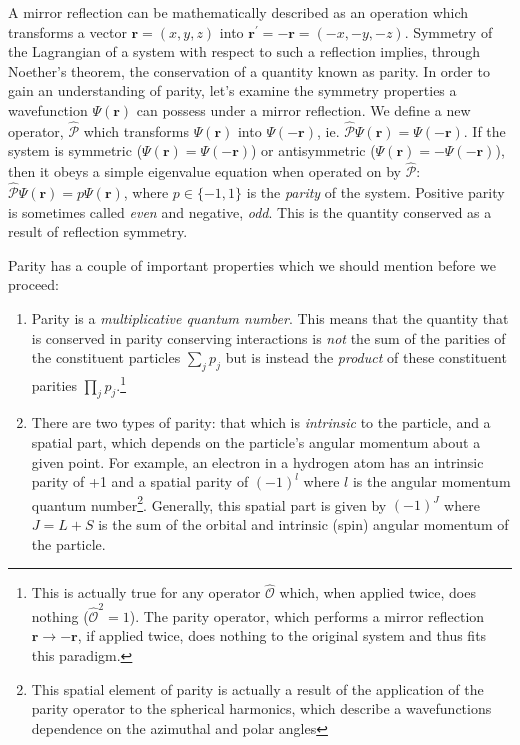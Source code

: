 \documentclass[12pt]{book}
\begin{document}
A mirror reflection can be mathematically described as an operation which transforms a vector $\mathbf{r}=(x,y,z)$ 
into 
$\mathbf{r^{'}}=-\mathbf{r}=(-x,-y,-z)$. 
Symmetry of the Lagrangian of a system with respect to such a reflection implies, through Noether's theorem, the conservation of a quantity known as parity. In order to gain an understanding of parity, let's examine the symmetry properties a wavefunction 
$\Psi(\mathbf{r})$ 
can possess under a mirror reflection. We define a new operator, 
$\hat{\mathcal{P}}$ 
which transforms 
$\Psi(\mathbf{r})$
into 
$\Psi(-\mathbf{r})$,
ie. $\hat{\mathcal{P}}\Psi(\mathbf{r})=\Psi(-\mathbf{r})$.
If the system is symmetric ($\Psi(\mathbf{r})=\Psi(-\mathbf{r})$) or antisymmetric ($\Psi(\mathbf{r})=-\Psi(-\mathbf{r})$), then it obeys a simple eigenvalue equation when operated on by $\hat{\mathcal{P}}$: $\hat{\mathcal{P}}\Psi(\mathbf{r})=p\Psi(\mathbf{r})$, where $p\in \{-1,1\}$ is the \emph{parity} of the system\cite{brandt}. Positive parity is sometimes called \emph{even} and negative, \emph{odd}. This is the quantity conserved as a result of reflection symmetry.

Parity has a couple of important properties which we should mention before we proceed:

\begin{enumerate}

\label{list 1}

\item Parity is a \emph{multiplicative quantum number}. This means that the quantity that is conserved in parity conserving interactions is \emph{not} the sum of the parities of the constituent particles
$\displaystyle\sum_{j} p_j$
but is instead the \emph{product} of these constituent parities $\displaystyle\prod_{j} p_j$.\footnote{This is actually true for any operator $\hat{\mathcal{O}}$ which, when applied twice, does nothing ($\hat{\mathcal{O}}^{2}=1$). The parity operator, which performs a mirror reflection $\mathbf{r}\longrightarrow -\mathbf{r}$, if applied twice, does nothing to the original system and thus fits this paradigm.}\cite{Hamermesh}

\item There are two types of parity: that which is \emph{intrinsic} to the particle, and a spatial part, which depends on the particle's angular momentum about a given point. For example, an electron in a hydrogen atom has an intrinsic parity of +1 and a spatial parity of $(-1)^{l}$ where $l$ is the angular momentum quantum number\footnote{This spatial element of parity is actually a result of the application of the parity operator to the spherical harmonics, which describe a wavefunctions dependence on the azimuthal and polar angles}. Generally, this spatial part is given by $(-1)^{J}$ where $J=L+S$ is the sum of the orbital and intrinsic (spin) angular momentum of the particle.

\end{enumerate} 
\end{document}
